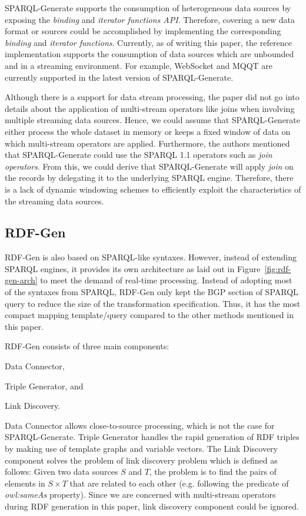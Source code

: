 SPARQL-Generate supports the consumption of heterogeneous data sources by exposing the 
\emph{binding} and \emph{iterator functions API}. Therefore, covering a new data format or sources could be accomplished 
by implementing the corresponding \emph{binding} and \emph{iterator functions}. Currently, as of writing this paper, 
the reference implementation supports the consumption of data sources which are unbounded and in a streaming environment. 
For example, WebSocket and MQQT are currently supported in the latest version of SPARQL-Generate. 



Although there is a support for data stream processing, the paper did not go into details 
about the application of multi-stream operators like joins when involving multiple streaming 
data sources. Hence, we could assume that SPARQL-Generate either process the whole dataset in memory or 
keeps a fixed window of data on which multi-stream operators are applied. Furthermore, the 
authors mentioned that SPARQL-Generate could use the SPARQL 1.1 operators such as \emph{join operators}. 
From this, we could derive that SPARQL-Generate will apply \emph{join} on the 
records by delegating it to the underlying SPARQL engine. 
Therefore, there is a lack of  
dynamic windowing schemes to efficiently exploit the characteristics of the streaming data sources.  

\subsection{RDF-Gen}
RDF-Gen\cite{rdf_gen} is also based on SPARQL-like syntaxes. However, instead of extending SPARQL engines, 
it provides its own architecture as laid out in Figure~\ref{fig:rdf-gen-arch} to meet the demand
of real-time processing. Instead of adopting most of the syntaxes from SPARQL, RDF-Gen only 
kept the BGP section of SPARQL query to reduce the size of the transformation specification. 
Thus, it has the most compact mapping template/query compared to the other methods mentioned in this paper. 

RDF-Gen consists of three main components: 
\begin{enumerate*}[label=(\alph*)]
  \item Data Connector,
  \item Triple Generator, and
  \item Link Discovery.
\end{enumerate*}
Data Connector allows close-to-source processing, which is not the case for SPARQL-Generate. 
Triple Generator handles the rapid generation of RDF triples by making use of 
template graphs and variable vectors. The Link Discovery component solves the 
problem of link discovery problem which is defined as follows:
Given two data sources $S$ and $T$, the problem is to find the pairs of elements in 
$S \times T$ that are related to each other (e.g. following the predicate of 
\emph{owl:sameAs} property). Since we are concerned with 
multi-stream operators during RDF generation in this paper, link discovery component could be ignored. 



